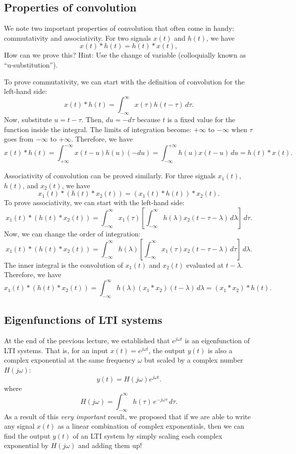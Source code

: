 \subsection{Properties of convolution}
We note two important properties of convolution that often come in handy: commutativity and associativity. For two signals $x(t)$ and $h(t)$, we have
\[
x(t)*h(t)=h(t)*x(t),
\]
How can we prove this? Hint: Use the change of variable (colloquially known as ``u-substitution'').

To prove commutativity, we can start with the definition of convolution for the left-hand side:
\[
x(t)*h(t)=\int_{-\infty}^{\infty} x(\tau)h(t-\tau)\,d\tau.
\]
Now, substitute $u = t - \tau$. Then, $du = -d\tau$ because $t$ is a fixed value for the function inside the integral. The limits of integration become: $+\infty$ to $-\infty$ when $\tau$ goes from $-\infty$ to $+\infty$. Therefore, we have
\[
x(t)*h(t)=\int_{+\infty}^{-\infty} x(t-u)h(u)(-du)=\int_{-\infty}^{+\infty} h(u)x(t-u)\,du=h(t)*x(t).
\]

Associativity of convolution can be proved similarly. For three signals $x_1(t)$, $h(t)$, and $x_2(t)$, we have
\[
x_1(t)*(h(t)*x_2(t))=(x_1(t)*h(t))*x_2(t).
\]
To prove associativity, we can start with the left-hand side:
\[
x_1(t)*(h(t)*x_2(t))=\int_{-\infty}^{\infty} x_1(\tau)\left[\int_{-\infty}^{\infty} h(\lambda)x_2(t-\tau-\lambda)\,d\lambda\right]\,d\tau.
\]
Now, we can change the order of integration:
\[
x_1(t)*(h(t)*x_2(t))=\int_{-\infty}^{\infty} h(\lambda)\left[\int_{-\infty}^{\infty} x_1(\tau)x_2(t-\tau-\lambda)\,d\tau\right]\,d\lambda.
\] 
The inner integral is the convolution of $x_1(t)$ and $x_2(t)$ evaluated at $t-\lambda$. Therefore, we have
\[
x_1(t)*(h(t)*x_2(t))=\int_{-\infty}^{\infty} h(\lambda)(x_1*x_2)(t-\lambda)\,d\lambda=(x_1*x_2)*h(t).
\]

\subsection{Eigenfunctions of LTI systems}
At the end of the previous lecture, we established that $e^{j\omega t}$ is an eigenfunction of LTI systems. That is, for an input $x(t)=e^{j\omega t}$, the output $y(t)$ is also a complex exponential at the same frequency $\omega$ but scaled by a complex number $H(j\omega)$:
\[
y(t)=H(j\omega)e^{j\omega t}.
\]
where
\[
H(j\omega)=\int_{-\infty}^{\infty} h(\tau)\,e^{-j\omega \tau}\,d\tau.
\]
As a result of this \emph{very important} result, we proposed that if we are able to write any signal $x(t)$ as a linear combination of complex exponentials, then we can find the output $y(t)$ of an LTI system by simply scaling each complex exponential by $H(j\omega)$ and adding them up!

